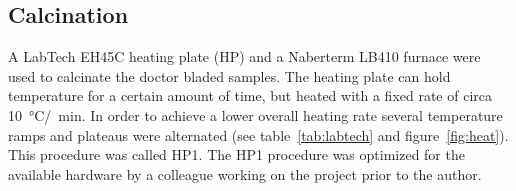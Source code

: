 \documentclass[a4paper]{article}
\newcommand{\td}[1]{\textcolor{red}{#1}}
\newcommand{\minutes}[1]{\SI{#1}{\minute}}
\newcommand{\oc}[1]{\SI{#1}{\degreeCelsius}}
\begin{document}
\subsection{Calcination}
A LabTech EH45C heating plate (HP) and a Naberterm LB410 furnace were used to calcinate the doctor bladed samples. 
The heating plate can hold temperature for a certain amount of time, but heated with a fixed rate of circa \oc{10}/\minutes{}.
In order to achieve a lower overall heating rate several temperature ramps and plateaus were alternated (see table~\ref{tab:labtech} and figure~\ref{fig:heat}).
This procedure was called HP1.
The HP1 procedure was optimized for the available hardware by a colleague working on the project prior to the author.
\end{document}
